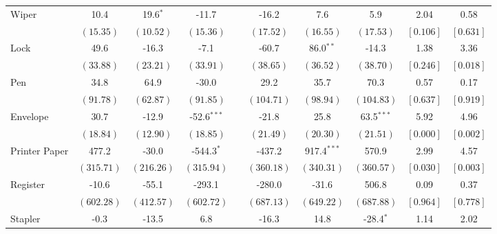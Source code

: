 \begin{tabular}{lccccccccc}
 \multirow{2}{*}{Wiper}  &   10.4 &   19.6$^{*}$ &  -11.7 &  &  -16.2 &    7.6 &    5.9 &   2.04 &   0.58 \\ 
 & $ \left( 15.35\right) $  & $ \left( 10.52\right) $  & $ \left( 15.36\right) $ &  & $ \left( 17.52\right) $  & $ \left( 16.55\right) $  & $ \left( 17.53\right) $  & $ \left[ 0.106\right] $  & $ \left[ 0.631\right] $  \\ [0.25em] 
 \multirow{2}{*}{Lock}  &   49.6 &  -16.3 &   -7.1 &  &  -60.7 &   86.0$^{**}$ &  -14.3 &   1.38 &   3.36 \\ 
 & $ \left( 33.88\right) $  & $ \left( 23.21\right) $  & $ \left( 33.91\right) $ &  & $ \left( 38.65\right) $  & $ \left( 36.52\right) $  & $ \left( 38.70\right) $  & $ \left[ 0.246\right] $  & $ \left[ 0.018\right] $  \\ [0.25em] 
 \multirow{2}{*}{Pen}  &   34.8 &   64.9 &  -30.0 &  &   29.2 &   35.7 &   70.3 &   0.57 &   0.17 \\ 
 & $ \left( 91.78\right) $  & $ \left( 62.87\right) $  & $ \left( 91.85\right) $ &  & $ \left(104.71\right) $  & $ \left( 98.94\right) $  & $ \left(104.83\right) $  & $ \left[ 0.637\right] $  & $ \left[ 0.919\right] $  \\ [0.25em] 
 \multirow{2}{*}{Envelope}  &   30.7 &  -12.9 &  -52.6$^{***}$ &  &  -21.8 &   25.8 &   63.5$^{***}$ &   5.92 &   4.96 \\ 
 & $ \left( 18.84\right) $  & $ \left( 12.90\right) $  & $ \left( 18.85\right) $ &  & $ \left( 21.49\right) $  & $ \left( 20.30\right) $  & $ \left( 21.51\right) $  & $ \left[ 0.000\right] $  & $ \left[ 0.002\right] $  \\ [0.25em] 
 \multirow{2}{*}{Printer Paper}  &  477.2 &  -30.0 & -544.3$^{*}$ &  & -437.2 &  917.4$^{***}$ &  570.9 &   2.99 &   4.57 \\ 
 & $ \left(315.71\right) $  & $ \left(216.26\right) $  & $ \left(315.94\right) $ &  & $ \left(360.18\right) $  & $ \left(340.31\right) $  & $ \left(360.57\right) $  & $ \left[ 0.030\right] $  & $ \left[ 0.003\right] $  \\ [0.25em] 
 \multirow{2}{*}{Register}  &  -10.6 &  -55.1 & -293.1 &  & -280.0 &  -31.6 &  506.8 &   0.09 &   0.37 \\ 
 & $ \left(602.28\right) $  & $ \left(412.57\right) $  & $ \left(602.72\right) $ &  & $ \left(687.13\right) $  & $ \left(649.22\right) $  & $ \left(687.88\right) $  & $ \left[ 0.964\right] $  & $ \left[ 0.778\right] $  \\ [0.25em] 
 \multirow{2}{*}{Stapler}  &   -0.3 &  -13.5 &    6.8 &  &  -16.3 &   14.8 &  -28.4$^{*}$ &   1.14 &   2.02 \\ 

\end{tabular}
